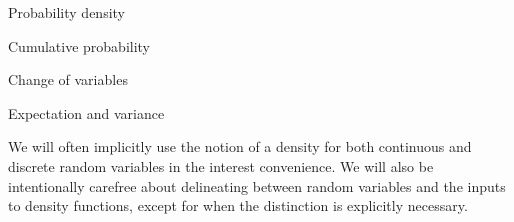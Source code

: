 Probability density

Cumulative probability

Change of variables

Expectation and variance



We will often implicitly use the notion of a density 
for both continuous and discrete random variables in the interest
convenience.  We will also be intentionally carefree about delineating between random
variables and the inputs to density functions, except for when the distinction is explicitly necessary.
